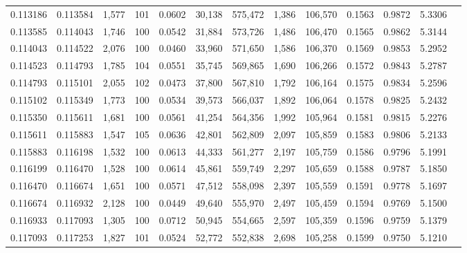 \begin{tabular}{rrrrrrrrrrrrr}
0.113186 & 0.113584 & 1,577 & 101 &                                     0.0602 &  30,138 & 575,472 &   1,386 & 106,570 & 0.1563 & 0.9872 & 5.3306 \\
0.113585 & 0.114043 & 1,746 & 100 &                                     0.0542 &  31,884 & 573,726 &   1,486 & 106,470 & 0.1565 & 0.9862 & 5.3144 \\
0.114043 & 0.114522 & 2,076 & 100 &                                     0.0460 &  33,960 & 571,650 &   1,586 & 106,370 & 0.1569 & 0.9853 & 5.2952 \\
0.114523 & 0.114793 & 1,785 & 104 &                                     0.0551 &  35,745 & 569,865 &   1,690 & 106,266 & 0.1572 & 0.9843 & 5.2787 \\
0.114793 & 0.115101 & 2,055 & 102 &                                     0.0473 &  37,800 & 567,810 &   1,792 & 106,164 & 0.1575 & 0.9834 & 5.2596 \\
0.115102 & 0.115349 & 1,773 & 100 &                                     0.0534 &  39,573 & 566,037 &   1,892 & 106,064 & 0.1578 & 0.9825 & 5.2432 \\
0.115350 & 0.115611 & 1,681 & 100 &                                     0.0561 &  41,254 & 564,356 &   1,992 & 105,964 & 0.1581 & 0.9815 & 5.2276 \\
0.115611 & 0.115883 & 1,547 & 105 &                                     0.0636 &  42,801 & 562,809 &   2,097 & 105,859 & 0.1583 & 0.9806 & 5.2133 \\
0.115883 & 0.116198 & 1,532 & 100 &                                     0.0613 &  44,333 & 561,277 &   2,197 & 105,759 & 0.1586 & 0.9796 & 5.1991 \\
0.116199 & 0.116470 & 1,528 & 100 &                                     0.0614 &  45,861 & 559,749 &   2,297 & 105,659 & 0.1588 & 0.9787 & 5.1850 \\
0.116470 & 0.116674 & 1,651 & 100 &                                     0.0571 &  47,512 & 558,098 &   2,397 & 105,559 & 0.1591 & 0.9778 & 5.1697 \\
0.116674 & 0.116932 & 2,128 & 100 &                                     0.0449 &  49,640 & 555,970 &   2,497 & 105,459 & 0.1594 & 0.9769 & 5.1500 \\
0.116933 & 0.117093 & 1,305 & 100 &                                     0.0712 &  50,945 & 554,665 &   2,597 & 105,359 & 0.1596 & 0.9759 & 5.1379 \\
0.117093 & 0.117253 & 1,827 & 101 &                                     0.0524 &  52,772 & 552,838 &   2,698 & 105,258 & 0.1599 & 0.9750 & 5.1210 \\

\end{tabular}

